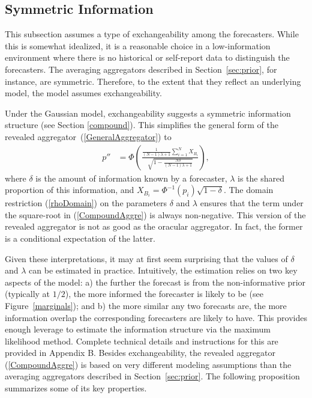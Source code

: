 \documentclass[12pt]{article}
\theoremstyle{definition}
\theoremstyle{definition}
\begin{document}
\subsection{Symmetric Information}
\label{compound2}
This subsection assumes a type of exchangeability among the forecasters.
While this is somewhat idealized, it is a reasonable choice in a
low-information environment where there is no historical or
self-report data to distinguish the forecasters.  The averaging
aggregators described in Section~\ref{sec:prior}, for instance, are
symmetric. Therefore, to the extent that they reflect an underlying
model, the model assumes exchangeability. 

Under the Gaussian model, exchangeability suggests a
symmetric information structure (see Section \ref{compound}). This simplifies the
general form of the revealed aggregator~(\ref{GeneralAggregator})  to
\begin{align}
p''
  &=\Phi\left(\frac{\frac{1}{(N-1)\lambda +1} 
  \sum_{i=1}^N X_{B_i} }{\sqrt{1- \frac{N\delta}{(N-1)\lambda +1} }}  
  \right), \label{CompoundAggre}
\end{align}
where $\delta$ is the amount of information known by a forecaster, 
$\lambda$ is the shared proportion of this information, and $X_{B_i} =
\Phi^{-1}(p_i)\sqrt{1-\delta}$. 
The domain restriction (\ref{rhoDomain}) on the parameters $\delta$ and $\lambda$ ensures that the term under
the square-root in (\ref{CompoundAggre}) is always non-negative. This version of the revealed aggregator is not as good as the oracular
aggregator. In fact, the former is a conditional expectation of the latter.

Given these interpretations, it may at first seem surprising that the
values of $\delta$ and $\lambda$ can be estimated in practice.
Intuitively, the estimation relies on two key aspects of the model: a)
the further the forecast is from the non-informative prior (typically
at $1/2$), the more informed the forecaster is likely to be (see
Figure~\ref{marginals}); and b) the more similar any two forecasts
are, the more information overlap the corresponding forecasters are
likely to have. This provides enough leverage to estimate the
information structure via the maximum likelihood method.  Complete
technical details and instructions for this are provided in 
Appendix B.  Besides exchangeability, the revealed aggregator
(\ref{CompoundAggre}) is based on very different modeling assumptions
than the averaging aggregators described in
Section~\ref{sec:prior}. The following proposition summarizes some of
its key properties.
\end{document}
